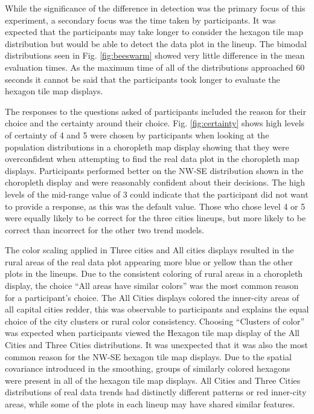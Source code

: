 \documentclass[journal]{vgtc}                     %
\begin{document}
While the significance of the difference in detection was the primary focus of this experiment, a secondary focus was the time taken by participants. It was expected that the participants may take longer to consider the hexagon tile map distribution but would be able to detect the data plot in the lineup. The bimodal distributions seen in Fig. \ref{fig:beeswarm} showed very little difference in the mean evaluation times. As the maximum time of all of the distributions approached 60 seconds it cannot be said that the participants took longer to evaluate the hexagon tile map displays.

The responses to the questions asked of participants included the reason for their choice and the certainty around their choice.
Fig. \ref{fig:certainty} shows high levels of certainty of 4 and 5 were chosen by participants when looking at the population distributions in a choropleth map display showing that they were overconfident when attempting to find the real data plot in the choropleth map displays. Participants performed better on the NW-SE distribution shown in the choropleth display and were reasonably confident about their decisions.
The high levels of the mid-range value of 3 could indicate that the participant did not want to provide a response, as this was the default value. Those who chose level 4 or 5 were equally likely to be correct for the three cities lineups, but more likely to be correct than incorrect for the other two trend models.

The color scaling applied in Three cities and All cities displays resulted in the rural areas of the real data plot appearing more blue or yellow than the other plots in the lineups.
Due to the consistent coloring of rural areas in a choropleth display, the choice ``All areas have similar colors'' was the most common reason for a participant's choice. The All Cities displays colored the inner-city areas of all capital cities redder, this was observable to participants and explains the equal choice of the city clusters or rural color consistency.
Choosing ``Clusters of color'' was expected when participants viewed the Hexagon tile map display of the All Cities and Three Cities distributions. It was unexpected that it was also the most common reason for the NW-SE hexagon tile map displays.
Due to the spatial covariance introduced in the smoothing, groups of similarly colored hexagons were present in all of the hexagon tile map displays. All Cities and Three Cities distributions of real data trends had distinctly different patterns or red inner-city areas, while some of the plots in each lineup may have shared similar features.
\end{document}
